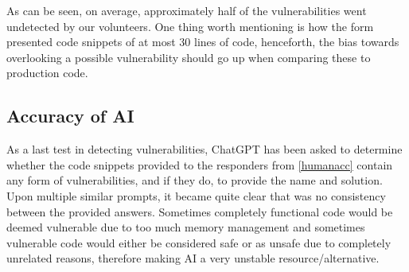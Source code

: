 \noindent As can be seen, on average, approximately half of the vulnerabilities went undetected by our volunteers. One thing worth mentioning is how the form presented code snippets of at most 30 lines of code, henceforth, the bias towards overlooking a possible vulnerability should go up when comparing these to production code.








    
\subsection{Accuracy of AI}

As a last test in detecting vulnerabilities, ChatGPT has been asked to determine whether the code snippets provided to the responders from \ref{humanacc} contain any form of vulnerabilities, and if they do, to provide the name and solution. Upon multiple similar prompts, it became quite clear that was no consistency between the provided answers. Sometimes completely functional code would be deemed vulnerable due to too much memory management and sometimes vulnerable code would either be considered safe or as unsafe due to completely unrelated reasons, therefore making AI a very unstable resource/alternative.\\

